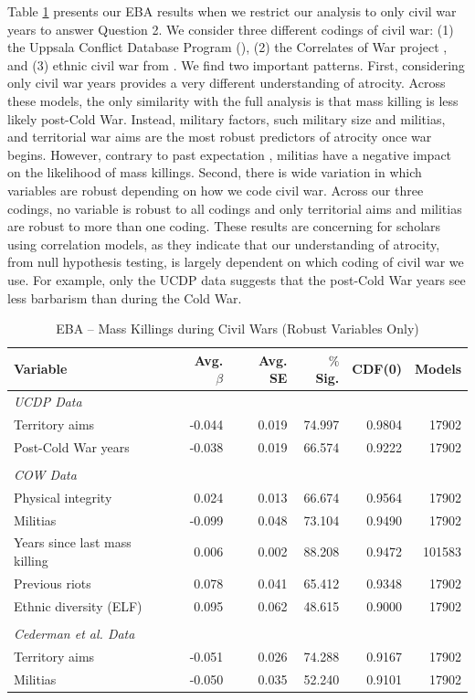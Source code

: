 \documentclass[a4paper,12pt]{article}
\begin{document}
Table \ref{tab:ucdp} presents our EBA results when we restrict our analysis to only civil war years to answer Question 2. We consider three different codings of civil war: (1) the Uppsala Conflict Database Program  (\citeyear{allansson2017organized,gleditsch2002armed}), (2) the Correlates of War project \citep{sarkees2010resort}, and (3) ethnic civil war from \citet{cederman2010ethnic}. We find two important patterns. First, considering only civil war years provides a very different understanding of atrocity. Across these models, the only similarity with the full analysis is that mass killing is less likely post-Cold War. Instead, military factors, such military size and militias, and territorial war aims are the most robust predictors of atrocity once war begins. However, contrary to past expectation \citep{koren2017means}, militias have a negative impact on the likelihood of mass killings. Second, there is wide variation in which variables are robust depending on how we code civil war. Across our three codings, no variable is robust to all codings and only territorial aims and militias are robust to more than one coding. These results are concerning for scholars using correlation models, as they indicate that our understanding of atrocity, from null hypothesis testing, is largely dependent on which coding of civil war we use. For example, only the UCDP data suggests that the post-Cold War years see less barbarism than during the Cold War.

\begin{table}[H]
\centering
\begin{tabular}{lrrrrr}
\hline
\textbf{Variable} & \textbf{Avg. $\beta$} & \textbf{Avg. SE} & \textbf{$\%$ Sig.} & \textbf{CDF(0)} & \textbf{Models} \\ \hline
\textit{UCDP Data} &  &  &  &  &  \\
Territory aims & -0.044 & 0.019 & 74.997 & 0.9804 & 17902 \\
Post-Cold War years & -0.038 & 0.019 & 66.574 & 0.9222 & 17902 \\
 &  &  &  &  &  \\
\textit{COW Data} &  &  &  &  &  \\
Physical integrity & 0.024 & 0.013 & 66.674 & 0.9564 & 17902 \\
Militias & -0.099 & 0.048 & 73.104 & 0.9490 & 17902 \\
Years since last mass killing & 0.006 & 0.002 & 88.208 & 0.9472 & 101583 \\
Previous riots & 0.078 & 0.041 & 65.412 & 0.9348 & 17902 \\
Ethnic diversity (ELF) & 0.095 & 0.062 & 48.615 & 0.9000 & 17902 \\
& & & & \\
\textit{Cederman et al. Data} &  &  &  &  &  \\
Territory aims & -0.051 & 0.026 & 74.288 & 0.9167 & 17902 \\
Militias & -0.050 & 0.035 & 52.240 & 0.9101 & 17902 \\ \hline
\end{tabular}
\caption{EBA -- Mass Killings during Civil Wars (Robust Variables Only)}
\label{tab:ucdp}
\end{table}
	
\end{document}
